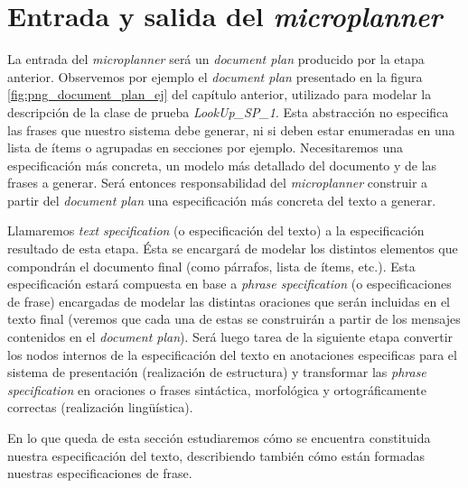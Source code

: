 

\section{Entrada y salida del \textit{microplanner}}
La entrada del \textit{microplanner} será un \textit{document plan} producido por la etapa anterior. Observemos por ejemplo el \textit{document plan} presentado en la figura \ref{fig:png_document_plan_ej} del capítulo anterior, utilizado para modelar la descripción de la clase de prueba \emph{LookUp\_SP\_1}. Esta abstracción no especifica las frases que nuestro sistema debe generar, ni si deben estar enumeradas en una lista de ítems o agrupadas en secciones por ejemplo. Necesitaremos una especificación más concreta, un modelo más detallado del documento y de las frases a generar. Será entonces responsabilidad del \textit{microplanner}  construir a partir del \textit{document plan} una especificación más concreta del texto a generar.

Llamaremos \emph{text specification} (o especificación del texto) a la especificación resultado de esta etapa. Ésta se encargará de modelar los distintos elementos que compondrán el documento final (como párrafos, lista de ítems, etc.). Esta especificación estará compuesta en base a \textit{phrase specification} (o especificaciones de frase) encargadas de modelar las distintas oraciones que serán incluidas en el texto final (veremos que cada una de estas se construirán a partir de los mensajes contenidos en el \textit{document plan}). Será luego tarea de la siguiente etapa convertir los nodos internos de la especificación del texto en anotaciones especificas para el sistema de presentación (realización de estructura) y transformar las \emph{phrase specification} en oraciones o frases sintáctica, morfológica y ortográficamente correctas (realización lingüística). 


En lo que queda de esta sección estudiaremos cómo se encuentra constituida nuestra especificación del texto, describiendo también cómo están formadas nuestras especificaciones de frase.

